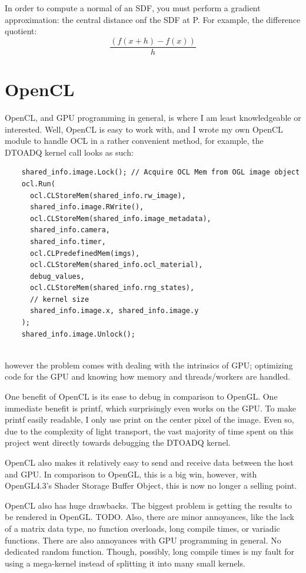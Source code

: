 \documentclass{article}
\begin{document}
  
  In order to compute a normal of an SDF, you must perform a gradient approximation: the central distance onf the SDF at
  P. For example, the difference quotient:
  \[\frac{(f(x+h) - f(x))}{h}\]

  \section{OpenCL}
	OpenCL, and GPU programming in general, is where I am least knowledgeable or interested. Well, OpenCL is easy to work with, and I wrote my own OpenCL module to handle OCL in a rather convenient method, for example, the DTOADQ kernel call looks as such:
	\begin{lstlisting}
	shared_info.image.Lock(); // Acquire OCL Mem from OGL image object
	ocl.Run(
	  ocl.CLStoreMem(shared_info.rw_image),
	  shared_info.image.RWrite(),
	  ocl.CLStoreMem(shared_info.image_metadata),
	  shared_info.camera,
	  shared_info.timer,
	  ocl.CLPredefinedMem(imgs),
	  ocl.CLStoreMem(shared_info.ocl_material),
	  debug_values,
	  ocl.CLStoreMem(shared_info.rng_states),
	  // kernel size
	  shared_info.image.x, shared_info.image.y
	);
	shared_info.image.Unlock();
	
	\end{lstlisting}
	
	however the problem comes with dealing with the intrinsics of GPU; optimizing code for the GPU and knowing how memory and threads/workers are handled.
  
  	One benefit of OpenCL is its ease to debug in comparison to OpenGL. One immediate benefit is printf, which surprisingly even works on the GPU. To make printf easily readable, I only use print on the center pixel of the image. Even so, due to the complexity of light transport, the vast majority of time spent on this project went directly towards debugging the DTOADQ kernel.
  	
  	OpenCL also makes it relatively easy to send and receive data between the host and GPU. In comparison to OpenGL, this is a big win, however, with OpenGL4.3's Shader Storage Buffer Object, this is now no longer a selling point.
  	
  	OpenCL also has huge drawbacks. The biggest problem is getting the results to be rendered in OpenGL. TODO. Also, there are minor annoyances, like the lack of a matrix data type, no function overloads, long compile times, or variadic functions. There are also annoyances with GPU programming in general. No dedicated random function. Though, possibly, long compile times is my fault for using a mega-kernel instead of splitting it into many small kernels.
  	
\end{document}
